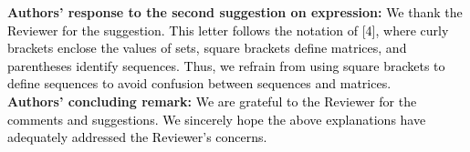 \textbf{Authors' response to the second suggestion on expression:} \textcolor{black}{We thank the Reviewer for the suggestion. This letter follows the notation of [4], %
where curly brackets enclose the values of sets, square brackets define matrices, and parentheses identify sequences. Thus, we refrain from using square brackets to define sequences to avoid confusion between sequences and matrices.}\\[4mm]
\textbf{Authors' concluding remark:} \textcolor{black}{We are grateful to the Reviewer for the comments and suggestions. We sincerely hope the above explanations have adequately addressed the Reviewer's concerns.}
